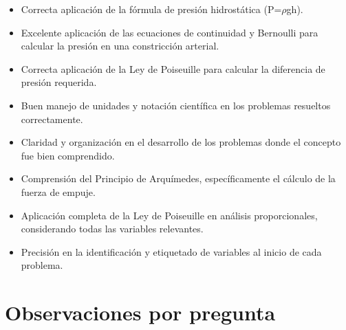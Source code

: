 \documentclass[11pt,a4paper]{article}
\begin{document}
\vspace{4pt}
\begin{minipage}[t]{0.48\linewidth}
  \begin{tcolorbox}[cajaFortaleza, title={Fortalezas}]
\begin{itemize}[leftmargin=1.5em, itemsep=2pt]
  \item Correcta aplicación de la fórmula de presión hidrostática (P=$\rho$gh).
  \item Excelente aplicación de las ecuaciones de continuidad y Bernoulli para calcular la presión en una constricción arterial.
  \item Correcta aplicación de la Ley de Poiseuille para calcular la diferencia de presión requerida.
  \item Buen manejo de unidades y notación científica en los problemas resueltos correctamente.
  \item Claridad y organización en el desarrollo de los problemas donde el concepto fue bien comprendido.
\end{itemize}
  \end{tcolorbox}
\end{minipage}
\hfill
\begin{minipage}[t]{0.48\linewidth}
  \begin{tcolorbox}[cajaMejora, title={Areas de mejora}]
\begin{itemize}[leftmargin=1.5em, itemsep=2pt]
  \item Comprensión del Principio de Arquímedes, específicamente el cálculo de la fuerza de empuje.
  \item Aplicación completa de la Ley de Poiseuille en análisis proporcionales, considerando todas las variables relevantes.
  \item Precisión en la identificación y etiquetado de variables al inicio de cada problema.
\end{itemize}
  \end{tcolorbox}
\end{minipage}

\section*{Observaciones por pregunta}
\end{document}
